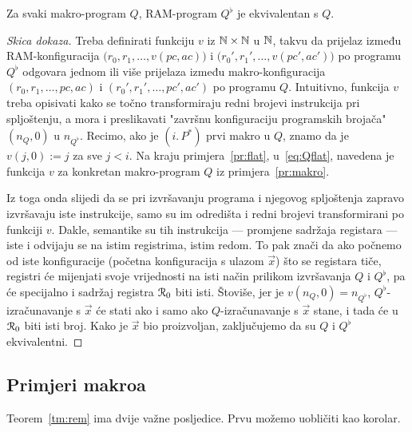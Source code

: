 \begin{teorem}[{name=[ekvivalentnost programa i njegovog spljoštenja]}]\label{tm:rem}
Za svaki makro-program $Q$, RAM-program $Q^\flat$ je ekvivalentan s $Q$.
\end{teorem}
\begin{proof}[Skica dokaza]
Treba definirati funkciju $v$ iz ${\mathbb N}\times{\mathbb N}$ u ${\mathbb N}$, takvu da prijelaz između RAM-konfiguracija $\bigl(r_0,r_1,\dotsc,v(pc,ac)\bigr)$ i $\bigl(r_0',r_1',\dotsc,v(pc',ac')\bigr)$ po programu $Q^\flat$ odgovara jednom ili više prijelaza između makro-konfiguracija $(r_0,r_1,\dotsc,pc,ac)$ i $(r_0',r_1',\dotsc,pc',ac')$ po programu $Q$. Intuitivno, funkcija $v$ treba opisivati kako se točno transformiraju redni brojevi instrukcija pri spljoštenju, a mora i preslikavati "završnu konfiguraciju programskih brojača" $(n_Q,0)$ u $n_{Q^\flat}$. Recimo, ako je $(i.\,P^*)$ prvi makro u $Q$, znamo da je $v(j,0):=j$ za sve $j<i$. Na kraju primjera~\ref{pr:flat}, u~\eqref{eq:Qflat}, navedena je funkcija $v$ za konkretan makro-program $Q$ iz primjera~\ref{pr:makro}.

Iz toga onda slijedi da se pri izvršavanju programa i njegovog spljoštenja zapravo izvršavaju iste instrukcije, samo su im odredišta i redni brojevi transformirani po funkciji $v$. Dakle, semantike su tih instrukcija --- promjene sadržaja registara --- iste i odvijaju se na istim registrima, istim redom. To pak znači da ako počnemo od iste konfiguracije (početna konfiguracija s ulazom $\vec x$) što se registara tiče, registri će mijenjati svoje vrijednosti na isti način prilikom izvršavanja $Q$ i $Q^\flat$, pa će specijalno i sadržaj registra $\mathcal R_{0}$ biti isti. Štoviše, jer je $v(n_Q,0)=n_{Q^\flat}$, $Q^\flat$-izračunavanje s $\vec x$ će stati ako i samo ako $Q$-izračunavanje s $\vec x$ stane, i tada će u $\mathcal R_{0}$ biti isti broj. Kako je $\vec x$ bio proizvoljan, zaključujemo da su $Q$ i $Q^\flat$ ekvivalentni.
\end{proof}

\subsection{Primjeri makroa}
Teorem~\ref{tm:rem} ima dvije važne posljedice. Prvu možemo uobličiti kao korolar.

